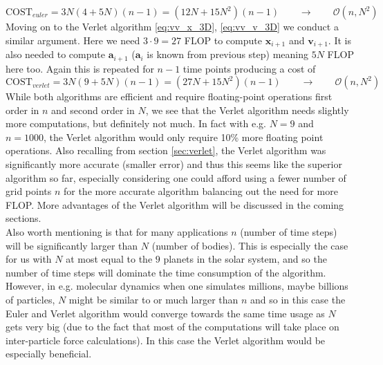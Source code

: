 \documentclass[12pt]{article}
\numberwithin{figure}{section}
\numberwithin{table}{section}
\begin{document}
\begin{equation}
	\text{COST}_{euler}=3N(4+5N)(n-1)=(12N+15N^2)(n-1) \qquad\rightarrow\qquad \mathcal{O}(n, N^2) \label{eq:cost_euler}
\end{equation}
Moving on to the Verlet algorithm \eqref{eq:vv_x_3D}, \eqref{eq:vv_v_3D} we conduct a similar argument. Here we need $3\cdot 9=27$ FLOP to compute $\mathbf{x}_{i+1}$ and $\mathbf{v}_{i+1}$. It is also needed to compute $\mathbf{a}_{i+1}$ ($\mathbf{a}_i$ is known from previous step) meaning $5N$ FLOP here too. Again this is repeated for $n-1$ time points producing a cost of
\begin{equation}
	\text{COST}_{verlet}=3N(9+5N)(n-1)=(27N+15N^2)(n-1) \qquad\rightarrow\qquad \mathcal{O}(n,N^2) \label{eq:cost_verlet}
\end{equation}
While both algorithms are efficient and require floating-point operations first order in $n$ and second order in $N$, we see that the Verlet algorithm needs slightly more computations, but definitely not much. In fact with e.g. $N=9$ and $n=1000$, the Verlet algorithm would only require 10\% more floating point operations. Also recalling from section \ref{sec:verlet}, the Verlet algorithm was significantly more accurate (smaller error) and thus this seems like the superior algorithm so far, especially considering one could afford using a fewer number of grid points $n$ for the more accurate algorithm balancing out the need for more FLOP. More advantages of the Verlet algorithm will be discussed in the coming sections. \\

\noindent Also worth mentioning is that for many applications $n$ (number of time steps) will be significantly larger than $N$ (number of bodies). This is especially the case for us with $N$ at most equal to the $9$ planets in the solar system, and so the number of time steps will dominate the time consumption of the algorithm. However, in e.g. molecular dynamics when one simulates millions, maybe billions of particles, $N$ might be similar to or much larger than $n$ and so in this case the Euler and Verlet algorithm would converge towards the same time usage as $N$ gets very big (due to the fact that most of the computations will take place on inter-particle force calculations). In this case the Verlet algorithm would be especially beneficial.

\end{document}
